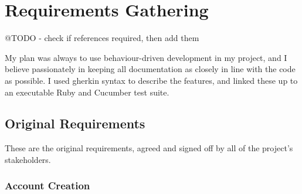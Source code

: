 \chapter{Requirements Gathering}\label{appendix:requirements}

@TODO - check if references required, then add them

My plan was always to use behaviour-driven development in my project, and I believe passionately in keeping all documentation as closely in line with the code as possible. I used gherkin syntax to describe the features, and linked these up to an executable Ruby and Cucumber test suite.

\section{Original Requirements}

These are the original requirements, agreed and signed off by all of the project's stakeholders. %

\subsection{Account Creation}

